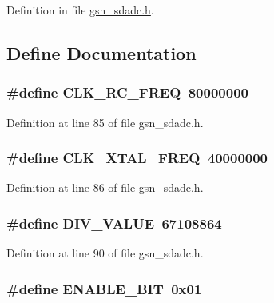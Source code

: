 Definition in file \hyperlink{a00583_source}{gsn\_\-sdadc.h}.



\subsection{Define Documentation}
\hypertarget{a00583_ab26b47862b744a0e5924fae7bc221229}{
\subsubsection[{CLK\_\-RC\_\-FREQ}]{\setlength{\rightskip}{0pt plus 5cm}\#define CLK\_\-RC\_\-FREQ~80000000}}
\label{a00583_ab26b47862b744a0e5924fae7bc221229}


Definition at line 85 of file gsn\_\-sdadc.h.

\hypertarget{a00583_a65657d27400d4a4b3c0ba706e9fb1585}{
\subsubsection[{CLK\_\-XTAL\_\-FREQ}]{\setlength{\rightskip}{0pt plus 5cm}\#define CLK\_\-XTAL\_\-FREQ~40000000}}
\label{a00583_a65657d27400d4a4b3c0ba706e9fb1585}


Definition at line 86 of file gsn\_\-sdadc.h.

\hypertarget{a00583_a361190788ca27b79952dee7533f4556f}{
\subsubsection[{DIV\_\-VALUE}]{\setlength{\rightskip}{0pt plus 5cm}\#define DIV\_\-VALUE~67108864}}
\label{a00583_a361190788ca27b79952dee7533f4556f}


Definition at line 90 of file gsn\_\-sdadc.h.

\hypertarget{a00583_a1281df33299eeb9c697f290e6cb0e550}{
\subsubsection[{ENABLE\_\-BIT}]{\setlength{\rightskip}{0pt plus 5cm}\#define ENABLE\_\-BIT~0x01}}
\label{a00583_a1281df33299eeb9c697f290e6cb0e550}


